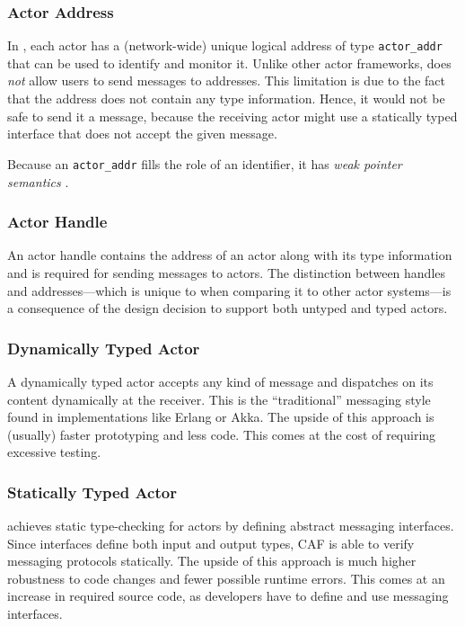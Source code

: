 \subsubsection{Actor Address}

In \lib, each actor has a (network-wide) unique logical address of type \lstinline^actor_addr^ that can be used to identify and monitor it.
Unlike other actor frameworks, \lib does \emph{not} allow users to send messages to addresses.
This limitation is due to the fact that the address does not contain any type information.
Hence, it would not be safe to send it a message, because the receiving actor might use a statically typed interface that does not accept the given message.

Because an \lstinline^actor_addr^ fills the role of an identifier, it has \emph{weak pointer semantics} .

\subsubsection{Actor Handle}

An actor handle contains the address of an actor along with its type information and is required for sending messages to actors.
The distinction between handles and addresses---which is unique to \lib when comparing it to other actor systems---is a consequence of the design decision to support both untyped and typed actors.

\subsubsection{Dynamically Typed Actor}

A dynamically typed actor accepts any kind of message and dispatches on its content dynamically at the receiver.
This is the ``traditional'' messaging style found in implementations like Erlang or Akka.
The upside of this approach is (usually) faster prototyping and less code.
This comes at the cost of requiring excessive testing.

\subsubsection{Statically Typed Actor}

\lib achieves static type-checking for actors by defining abstract messaging interfaces.
Since interfaces define both input and output types, CAF is able to verify messaging protocols statically.
The upside of this approach is much higher robustness to code changes and fewer possible runtime errors.
This comes at an increase in required source code, as developers have to define and use messaging interfaces.

